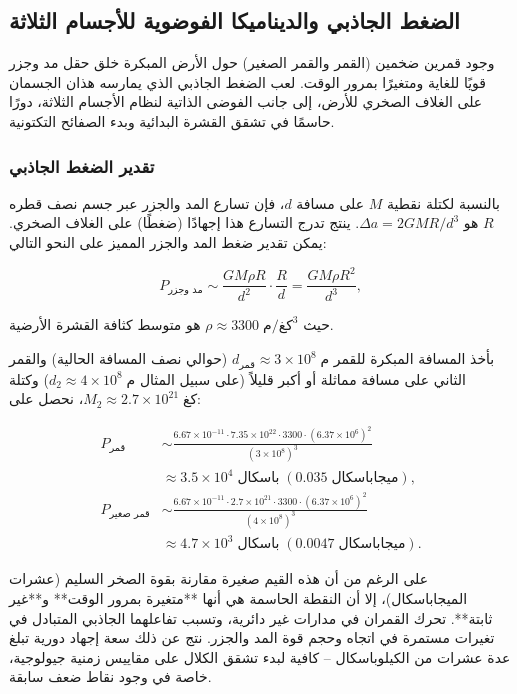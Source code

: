 \documentclass[11pt,a4paper]{article}
\begin{document}
	\subsection{الضغط الجاذبي والديناميكا الفوضوية للأجسام الثلاثة}
	
	وجود قمرين ضخمين (القمر والقمر الصغير) حول الأرض المبكرة خلق حقل مد وجزر قويًا للغاية ومتغيرًا بمرور الوقت. لعب الضغط الجاذبي الذي يمارسه هذان الجسمان على الغلاف الصخري للأرض، إلى جانب الفوضى الذاتية لنظام الأجسام الثلاثة، دورًا حاسمًا في تشقق القشرة البدائية وبدء الصفائح التكتونية.
	
	\subsubsection{تقدير الضغط الجاذبي}
	
	بالنسبة لكتلة نقطية \(M\) على مسافة \(d\)، فإن تسارع المد والجزر عبر جسم نصف قطره \(R\) هو \(\Delta a = 2GM R / d^{3}\). ينتج تدرج التسارع هذا إجهادًا (ضغطًا) على الغلاف الصخري. يمكن تقدير ضغط المد والجزر المميز على النحو التالي:
	
	\[
	P_{\text{مد وجزر}} \sim \frac{GM \rho R}{d^{2}} \cdot \frac{R}{d} = \frac{GM \rho R^{2}}{d^{3}},
	\]
	
	حيث \(\rho \approx 3300\;\text{كغ/م}^{3}\) هو متوسط كثافة القشرة الأرضية.  
	
	بأخذ المسافة المبكرة للقمر \(d_{\text{قمر}} \approx 3\times10^{8}\;\text{م}\) (حوالي نصف المسافة الحالية) والقمر الثاني على مسافة مماثلة أو أكبر قليلاً (على سبيل المثال \(d_{2} \approx 4\times10^{8}\;\text{م}\)) وكتلة \(M_{2} \approx 2.7\times10^{21}\;\text{كغ}\)، نحصل على:
	
	\[
	\begin{aligned}
		P_{\text{قمر}} &\sim \frac{6.67\times10^{-11} \cdot 7.35\times10^{22} \cdot 3300 \cdot (6.37\times10^{6})^{2}}{(3\times10^{8})^{3}} \\
		&\approx 3.5 \times 10^{4}\;\text{باسكال} \;(0.035\;\text{ميجاباسكال}),\\
		P_{\text{قمر صغير}} &\sim \frac{6.67\times10^{-11} \cdot 2.7\times10^{21} \cdot 3300 \cdot (6.37\times10^{6})^{2}}{(4\times10^{8})^{3}} \\
		&\approx 4.7 \times 10^{3}\;\text{باسكال} \;(0.0047\;\text{ميجاباسكال}).
	\end{aligned}
	\]
	
	على الرغم من أن هذه القيم صغيرة مقارنة بقوة الصخر السليم (عشرات الميجاباسكال)، إلا أن النقطة الحاسمة هي أنها **متغيرة بمرور الوقت** و**غير ثابتة**. تحرك القمران في مدارات غير دائرية، وتسبب تفاعلهما الجاذبي المتبادل في تغيرات مستمرة في اتجاه وحجم قوة المد والجزر. نتج عن ذلك سعة إجهاد دورية تبلغ عدة عشرات من الكيلوباسكال – كافية لبدء تشقق الكلال على مقاييس زمنية جيولوجية، خاصة في وجود نقاط ضعف سابقة.
	
\end{document}
